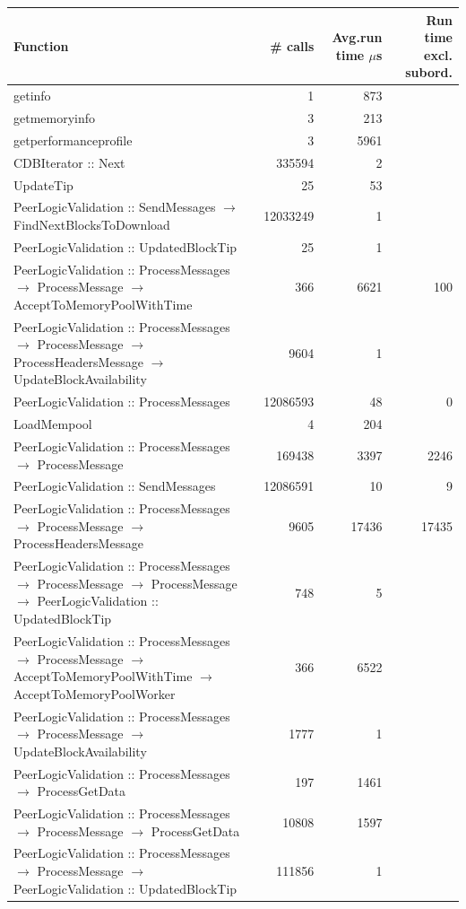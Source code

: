 \documentclass{article}
\begin{document}
\begin{longtable}{P{8cm}|r|r|r}
	Function&\# calls& Avg.run time $\mu$s& Run time excl. subord. \\\hline
	getinfo& 1& 873&\\\hline
	getmemoryinfo& 3& 213&\\\hline
	getperformanceprofile& 3& 5961&\\\hline
	CDBIterator :: Next& 335594& 2&\\\hline
	UpdateTip& 25& 53&\\\hline
	PeerLogicValidation :: SendMessages $\to$ FindNextBlocksToDownload& 12033249& 1&\\\hline
	PeerLogicValidation :: UpdatedBlockTip& 25& 1&\\\hline
	PeerLogicValidation :: ProcessMessages $\to$ ProcessMessage $\to$ AcceptToMemoryPoolWithTime& 366& 6621&100\\\hline
	PeerLogicValidation :: ProcessMessages $\to$ ProcessMessage $\to$ ProcessHeadersMessage $\to$ UpdateBlockAvailability& 9604& 1&\\\hline
	PeerLogicValidation :: ProcessMessages& 12086593& 48&0\\\hline
	LoadMempool& 4& 204&\\\hline
	PeerLogicValidation :: ProcessMessages $\to$ ProcessMessage& 169438& 3397&2246\\\hline
	PeerLogicValidation :: SendMessages& 12086591& 10&9\\\hline
	PeerLogicValidation :: ProcessMessages $\to$ ProcessMessage $\to$ ProcessHeadersMessage& 9605& 17436&17435\\\hline
	PeerLogicValidation :: ProcessMessages $\to$ ProcessMessage $\to$ ProcessMessage $\to$ PeerLogicValidation :: UpdatedBlockTip& 748& 5&\\\hline
	PeerLogicValidation :: ProcessMessages $\to$ ProcessMessage $\to$ AcceptToMemoryPoolWithTime $\to$ AcceptToMemoryPoolWorker& 366& 6522&\\\hline
	PeerLogicValidation :: ProcessMessages $\to$ ProcessMessage $\to$ UpdateBlockAvailability& 1777& 1&\\\hline
	PeerLogicValidation :: ProcessMessages $\to$ ProcessGetData& 197& 1461&\\\hline
	PeerLogicValidation :: ProcessMessages $\to$ ProcessMessage $\to$ ProcessGetData& 10808& 1597&\\\hline
	PeerLogicValidation :: ProcessMessages $\to$ ProcessMessage $\to$ PeerLogicValidation :: UpdatedBlockTip& 111856& 1&\\\hline

\end{longtable}
\end{document}
